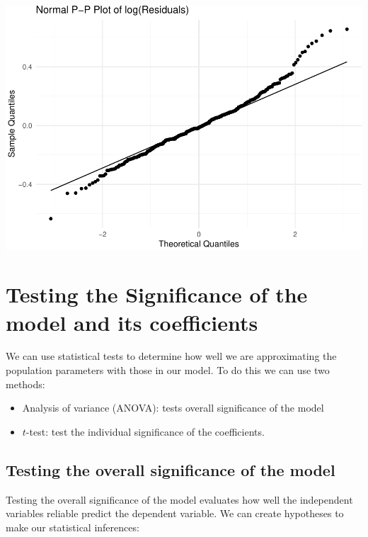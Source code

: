 \documentclass[
]{article}
\providecommand{\tightlist}{%
  \setlength{\itemsep}{0pt}\setlength{\parskip}{0pt}}
\begin{document}
\includegraphics{L8_Correlation_and_regression_pdf_files/figure-latex/unnamed-chunk-15-1.pdf}

\hypertarget{testing-the-significance-of-the-model-and-its-coefficients}{%
\section{Testing the Significance of the model and its
coefficients}\label{testing-the-significance-of-the-model-and-its-coefficients}}

We can use statistical tests to determine how well we are approximating
the population parameters with those in our model. To do this we can use
two methods:

\begin{itemize}
\tightlist
\item
  Analysis of variance (ANOVA): tests overall significance of the model
\item
  \(t\)-test: test the individual significance of the coefficients.
\end{itemize}

\hypertarget{testing-the-overall-significance-of-the-model}{%
\subsection{Testing the overall significance of the
model}\label{testing-the-overall-significance-of-the-model}}

Testing the overall significance of the model evaluates how well the
independent variables reliable predict the dependent variable. We can
create hypotheses to make our statistical inferences:
\end{document}
